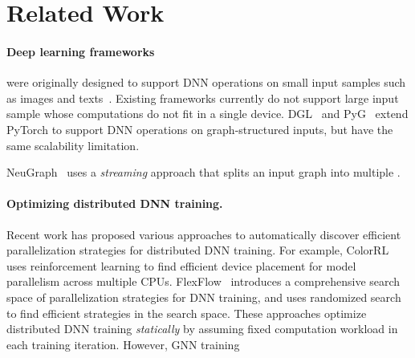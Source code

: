 \section{Related Work}
\label{sec:related}
\begin{table}
\caption{The graph partitioning strategies used by different frameworks. 
Balanced training and inference indicate whether an approach can achieve balanced workload partitioning for GNN training and inference, respectively.}
\label{tab:graph_partition}
\end{table}

\paragraph{Deep learning frameworks} were originally designed to support DNN operations on small input samples such as images and texts~\cite{TensorFlow, PyTorch, Caffe2}.
Existing frameworks currently do not support large input sample whose computations do not fit in a single device.
DGL~\cite{DGL} and PyG~\cite{PyG} extend PyTorch to support DNN operations on graph-structured inputs, but have the same scalability limitation.

NeuGraph~\cite{NeuGraph} uses a {\em streaming} approach that splits an input graph into multiple .

\paragraph{Optimizing distributed DNN training.}
Recent work has proposed various approaches to automatically discover efficient parallelization strategies for distributed DNN training.
For example, ColorRL~\cite{DevicePlace} uses reinforcement learning to find efficient device placement for model parallelism across multiple CPUs.
FlexFlow~\cite{FlexFlow, OptCNN} introduces a comprehensive search space of parallelization strategies for DNN training, and uses randomized search to find efficient strategies in the search space.
These approaches optimize distributed DNN training {\em statically} by assuming fixed computation workload in each training iteration.
However, GNN training 

